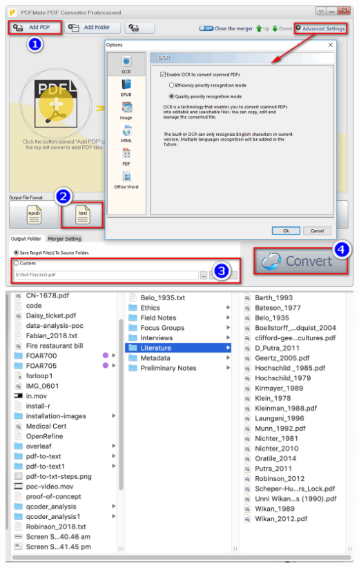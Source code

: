 \documentclass[unknownkeysallowed,usepdftitle=false, parskip=full]{beamer}
\begin{document}
\begin{frame}
\begin{columns}[t]
\begin{column}[c]{0.45\textwidth}
{\includegraphics[width=3\textwidth,height=0.5\textheight,keepaspectratio]{pdf-to-txt-steps.png}\\

\includegraphics[width=3\textwidth,height=0.5\textheight,keepaspectratio]{literature.png}


      }
    \end{column}
    
  \end{columns}

  
\end{frame}
\end{document}
